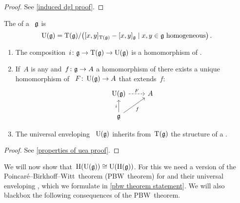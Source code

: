 \documentclass[a4paper,10pt,headings=standardclasses]{scrartcl}
\begin{document}
\begin{proof}
  See \cref{induced dgl proof}.
\end{proof}

\begin{definition}
  The  of a {\dgl}~$\mathfrak{g}$ is
  \[
    \Univ(\glie)
    =
    \dgTensor(\glie)
    /
    \bigl(
      [x,y]_{\dgTensor(\glie)} - [x,y]_{\glie}
    \suchthat
      \text{$x, y \in \glie$ homogeneous}
    \bigr) \,.
  \]
\end{definition}

\begin{proposition}
  \label{properties of uea}
  \leavevmode
  \begin{enumerate}
    \item
      The composition~$i \colon \mathfrak{g} \to \operatorname{T}(\mathfrak{g}) \to \operatorname{U}(\mathfrak{g})$ is a homomorphism of {\dgls}.
    \item
      If~$A$ is any {\dga} and~$f \colon \mathfrak{g} \to A$ a homomorphism of {\dgls} there exists a unique homomorphism of {\dgas}~$F \colon \operatorname{U}(\mathfrak{g}) \to A$ that extends~$f$:
      \[
        \begin{tikzcd}
          \Univ(\glie)
          \arrow[dashed]{r}[above]{F}
          &
          A
          \\
          \glie
          \arrow{u}[left]{i}
          \arrow{ur}[below right]{f}
          &
          {}
        \end{tikzcd}
      \]
    \item
      The universal enveloping {\dga}~$\operatorname{U}(\mathfrak{g})$ inherits from~$\operatorname{T}(\mathfrak{g})$ the structure of a {\dgh}.
  \end{enumerate}
\end{proposition}

\begin{proof}
  See \cref{properties of uea proof}.
\end{proof}

We will now show that~$\operatorname{H}(\operatorname{U}(\mathfrak{g})) \cong \operatorname{U}(\operatorname{H}(\mathfrak{g}))$.
For this we need a version of the Poincaré–Birkhoff–Witt~theorem (PBW~theorem) for {\dgls} and their universal enveloping {\dgas}, which we formulate in \cref{pbw theorem statement}.
We will also blackbox the following consequences of the PBW~theorem.
\end{document}
